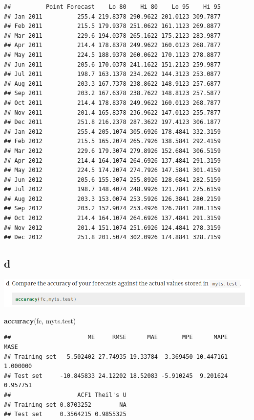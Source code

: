 \documentclass[]{book}
\newenvironment{Shaded}{\begin{snugshade}}{\end{snugshade}}
\newcommand{\KeywordTok}[1]{\textcolor[rgb]{0.13,0.29,0.53}{\textbf{#1}}}
\newcommand{\NormalTok}[1]{#1}
\begin{document}
\begin{verbatim}
##          Point Forecast    Lo 80    Hi 80    Lo 95    Hi 95
## Jan 2011          255.4 219.8378 290.9622 201.0123 309.7877
## Feb 2011          215.5 179.9378 251.0622 161.1123 269.8877
## Mar 2011          229.6 194.0378 265.1622 175.2123 283.9877
## Apr 2011          214.4 178.8378 249.9622 160.0123 268.7877
## May 2011          224.5 188.9378 260.0622 170.1123 278.8877
## Jun 2011          205.6 170.0378 241.1622 151.2123 259.9877
## Jul 2011          198.7 163.1378 234.2622 144.3123 253.0877
## Aug 2011          203.3 167.7378 238.8622 148.9123 257.6877
## Sep 2011          203.2 167.6378 238.7622 148.8123 257.5877
## Oct 2011          214.4 178.8378 249.9622 160.0123 268.7877
## Nov 2011          201.4 165.8378 236.9622 147.0123 255.7877
## Dec 2011          251.8 216.2378 287.3622 197.4123 306.1877
## Jan 2012          255.4 205.1074 305.6926 178.4841 332.3159
## Feb 2012          215.5 165.2074 265.7926 138.5841 292.4159
## Mar 2012          229.6 179.3074 279.8926 152.6841 306.5159
## Apr 2012          214.4 164.1074 264.6926 137.4841 291.3159
## May 2012          224.5 174.2074 274.7926 147.5841 301.4159
## Jun 2012          205.6 155.3074 255.8926 128.6841 282.5159
## Jul 2012          198.7 148.4074 248.9926 121.7841 275.6159
## Aug 2012          203.3 153.0074 253.5926 126.3841 280.2159
## Sep 2012          203.2 152.9074 253.4926 126.2841 280.1159
## Oct 2012          214.4 164.1074 264.6926 137.4841 291.3159
## Nov 2012          201.4 151.1074 251.6926 124.4841 278.3159
## Dec 2012          251.8 201.5074 302.0926 174.8841 328.7159
\end{verbatim}

\hypertarget{d}{%
\subsection{d}\label{d}}

\includegraphics{./week1/3.8d.png}

\begin{Shaded}
\begin{Highlighting}[]
\KeywordTok{accuracy}\NormalTok{(fc, myts.test)}
\end{Highlighting}
\end{Shaded}

\begin{verbatim}
##                      ME     RMSE      MAE       MPE      MAPE     MASE
## Training set   5.502402 27.74935 19.33784  3.369450 10.447161 1.000000
## Test set     -10.845833 24.12202 18.52083 -5.910245  9.201624 0.957751
##                   ACF1 Theil's U
## Training set 0.8703252        NA
## Test set     0.3564215 0.9855325
\end{verbatim}
\end{document}
